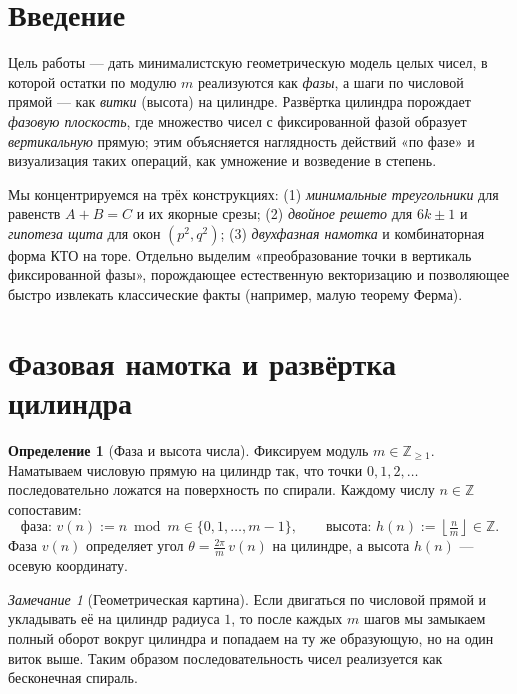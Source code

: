 \documentclass[12pt,a4paper]{article}
\newcommand{\Z}{\mathbb{Z}}
\theoremstyle{definition}
\newtheorem{definition}{Определение}[section]
\theoremstyle{plain}
\theoremstyle{remark}
\newtheorem*{remark}{Замечание}
\begin{document}
\tableofcontents

\section{Введение}
Цель работы — дать минималистскую геометрическую модель целых чисел, в которой
остатки по модулю $m$ реализуются как \emph{фазы}, а шаги по числовой
прямой — как \emph{витки} (высота) на цилиндре. Развёртка цилиндра порождает
\emph{фазовую плоскость}, где множество чисел с фиксированной фазой образует
\emph{вертикальную} прямую; этим объясняется наглядность действий «по фазе»
и визуализация таких операций, как умножение и возведение в степень.

Мы концентрируемся на трёх конструкциях:
(1) \emph{минимальные треугольники} для равенств $A+B=C$ и их якорные срезы;
(2) \emph{двойное решето} для $6k\pm1$ и \emph{гипотеза щита} для окон $(p^2,q^2)$;
(3) \emph{двухфазная намотка} и комбинаторная форма КТО на торе.
Отдельно выделим «преобразование точки в вертикаль фиксированной фазы», порождающее естественную
векторизацию и позволяющее быстро извлекать классические факты (например,
малую теорему Ферма).


\section{Фазовая намотка и развёртка цилиндра}

\begin{definition}[Фаза и высота числа]\label{def:phase-height}
Фиксируем модуль $m\in\Z_{\ge1}$. Наматываем числовую прямую на цилиндр
так, что точки $0,1,2,\dots$ последовательно ложатся на поверхность по спирали.
Каждому числу $n\in\Z$ сопоставим:
\[
  \text{фаза: } v(n):=n \bmod m \in \{0,1,\dots,m-1\},\qquad
  \text{высота: } h(n):=\left\lfloor \tfrac{n}{m}\right\rfloor \in \Z.
\]
Фаза $v(n)$ определяет угол $\theta=\tfrac{2\pi}{m}\,v(n)$ на цилиндре,
а высота $h(n)$ — осевую координату.
\end{definition}

\begin{remark}[Геометрическая картина]
Если двигаться по числовой прямой и укладывать её на цилиндр радиуса $1$,
то после каждых $m$ шагов мы замыкаем полный оборот вокруг цилиндра и
попадаем на ту же образующую, но на один виток выше.
Таким образом последовательность чисел реализуется как бесконечная спираль.
\end{remark}
\end{document}
